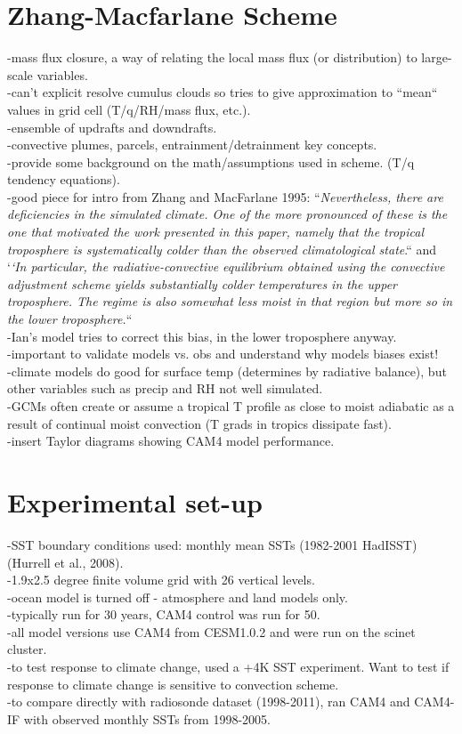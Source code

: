 \documentclass[letterpaper,12pt,titlepage,oneside,final]{book}
\begin{document}
\section{Zhang-Macfarlane Scheme}
-mass flux closure, a way of relating the local mass flux (or distribution) to large-scale variables.
\\
-can't explicit resolve cumulus clouds so tries to give approximation to ``mean`` values in grid cell (T/q/RH/mass flux, etc.).
\\
-ensemble of updrafts and downdrafts.
\\
-convective plumes, parcels, entrainment/detrainment key concepts.
\\
-provide some background on the math/assumptions used in scheme. (T/q tendency equations).
\\
-good piece for intro from Zhang and MacFarlane 1995: ``\textit{Nevertheless, there are deficiencies in the simulated climate. One of the more pronounced of these is the one that motivated the work presented
in this paper, namely that the tropical troposphere is systematically colder than
the observed climatological state}.`` and `\textit{`In particular, the radiative-convective equilibrium obtained using the convective
adjustment scheme yields substantially colder temperatures in the upper
troposphere. The regime is also somewhat less moist in that region but more so in
the lower troposphere.}``
\\
-Ian's model tries to correct this bias, in the lower troposphere anyway.
\\
-important to validate models vs. obs and understand why models biases exist!
\\
-climate models do good for surface temp (determines by radiative balance), but other variables such as precip and RH not well simulated. 
\\
-GCMs often create or assume a tropical T profile as close to moist adiabatic as a result of continual moist convection (T grads in tropics dissipate fast).
\\
-insert Taylor diagrams showing CAM4 model performance.
\section{Experimental set-up}
-SST boundary conditions used: monthly mean SSTs (1982-2001 HadISST) (Hurrell et al., 2008).
\\
-1.9x2.5 degree finite volume grid with 26 vertical levels.
\\
-ocean model is turned off - atmosphere and land models only.
\\
-typically run for 30 years, CAM4 control was run for 50. 
\\
-all model versions use CAM4 from CESM1.0.2 and were run on the scinet cluster.
\\
-to test response to climate change, used a +4K SST experiment. Want to test if response to climate change is sensitive to convection scheme.
\\
-to compare directly with radiosonde dataset (1998-2011), ran CAM4 and CAM4-IF with observed monthly SSTs from 1998-2005. 
\end{document}
